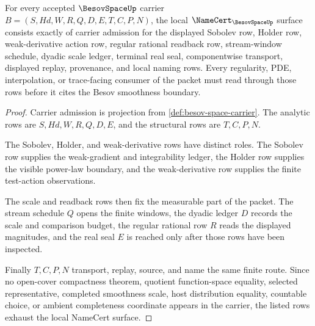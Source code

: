 \begin{theorem}
\label{thm:besov-space-namecert-obligations}
For every accepted $\BesovSpaceUp$ carrier $B=(S,Hd,W,R,Q,D,E,T,C,P,N)$, the local $\NameCert_{\BesovSpaceUp}$ surface consists exactly of carrier admission for the displayed Sobolev row, Holder row, weak-derivative action row, regular rational readback row, stream-window schedule, dyadic scale ledger, terminal real seal, componentwise transport, displayed replay, provenance, and local naming rows. Every regularity, PDE, interpolation, or trace-facing consumer of the packet must read through those rows before it cites the Besov smoothness boundary.
\end{theorem}
\begin{proof}
Carrier admission is projection from \autoref{def:besov-space-carrier}. The analytic rows are $S,Hd,W,R,Q,D,E$, and the structural rows are $T,C,P,N$.

The Sobolev, Holder, and weak-derivative rows have distinct roles. The Sobolev row supplies the weak-gradient and integrability ledger, the Holder row supplies the visible power-law boundary, and the weak-derivative row supplies the finite test-action observations.

The scale and readback rows then fix the measurable part of the packet. The stream schedule $Q$ opens the finite windows, the dyadic ledger $D$ records the scale and comparison budget, the regular rational row $R$ reads the displayed magnitudes, and the real seal $E$ is reached only after those rows have been inspected.

Finally $T,C,P,N$ transport, replay, source, and name the same finite route. Since no open-cover compactness theorem, quotient function-space equality, selected representative, completed smoothness scale, host distribution equality, countable choice, or ambient completeness coordinate appears in the carrier, the listed rows exhaust the local NameCert surface.
\end{proof}

